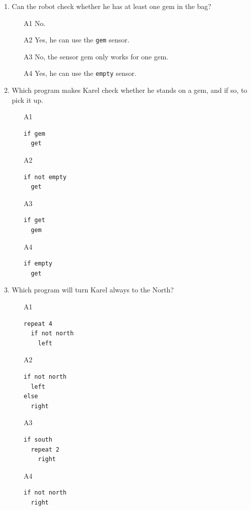 \documentclass[article,A4,12pt]{llncs}
\begin{document}
{{{{\begin{enumerate}
\begin{enumerate}
\item[A1] Yes but his home must be in front of him.
\item[A2] Yes, there is the sensor {\tt home} for that.
\item[A3] No.
\item[A4] Yes but not when he is at home.
\end{enumerate}
\item Can the robot check whether he has at least one gem in the bag?
\begin{enumerate}
\item[A1] No.
\item[A2] Yes, he can use the {\tt gem} sensor. 
\item[A3] No, the sensor gem only works for one gem.
\item[A4] Yes, he can use the {\tt empty} sensor.
\end{enumerate}
\item Which program makes Karel check whether he stands on a gem, and if so, to pick it up.
\begin{enumerate}
\item[A1] 
\begin{verbatim}
if gem
  get
\end{verbatim}
\item[A2] 
\begin{verbatim}
if not empty
  get
\end{verbatim}
\item[A3] 
\begin{verbatim}
if get
  gem
\end{verbatim}
\item[A4] 
\begin{verbatim}
if empty
  get
\end{verbatim}
\end{enumerate}
\item Which program will turn Karel always to the North?
\begin{enumerate}
\item[A1] 
\begin{verbatim}
repeat 4
  if not north 
    left
\end{verbatim}
\item[A2] 
\begin{verbatim}
if not north 
  left
else 
  right
\end{verbatim}
\item[A3] 
\begin{verbatim}
if south
  repeat 2
    right
\end{verbatim}
\item[A4] 
\begin{verbatim}
if not north 
  right
\end{verbatim}\end{enumerate}


\end{enumerate}}}}}
\end{document}
